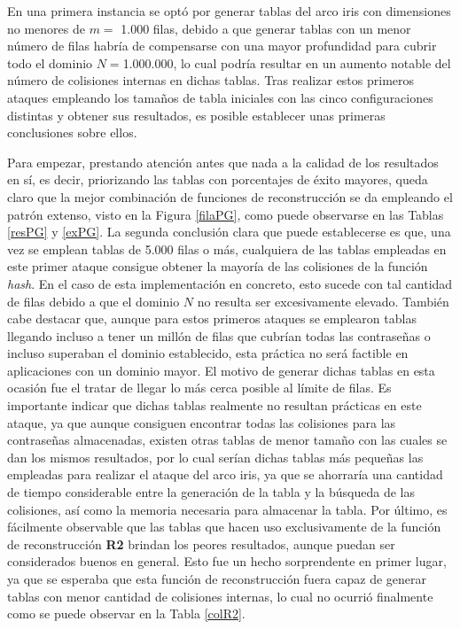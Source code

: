 \documentclass[12pt,spanish,listoffigures,listoftables,listofalgorithms]{tfgetsinf}
\newcommand{\hash}{\textit{hash}}
\begin{document}

En una primera instancia se optó por generar tablas del arco iris con dimensiones no menores de $m =$ 1.000 filas, debido a que generar tablas con un menor número de filas habría de compensarse con una mayor profundidad para cubrir todo el dominio $N = $1.000.000, lo cual podría resultar en un aumento notable del número de colisiones internas en dichas tablas. Tras realizar estos primeros ataques empleando los tamaños de tabla iniciales con las cinco configuraciones distintas y obtener sus resultados, es posible establecer unas primeras conclusiones sobre ellos.

Para empezar, prestando atención antes que nada a la calidad de los resultados en sí, es decir, priorizando las tablas con porcentajes de éxito mayores, queda claro que la mejor combinación de funciones de reconstrucción se da empleando el patrón extenso, visto en la Figura \ref{filaPG}, como puede observarse en las Tablas \ref{resPG} y \ref{exPG}. La segunda conclusión clara que puede establecerse es que, una vez se emplean tablas de 5.000 filas o más, cualquiera de las tablas empleadas en este primer ataque consigue obtener la mayoría de las colisiones de la función \hash. En el caso de esta implementación en concreto, esto sucede con tal cantidad de filas debido a que el dominio $N$ no resulta ser excesivamente elevado. También cabe destacar que, aunque para estos primeros ataques se emplearon tablas llegando incluso a tener un millón de filas que cubrían todas las contraseñas o incluso superaban el dominio establecido, esta práctica no será factible en aplicaciones con un dominio mayor. El motivo de generar dichas tablas en esta ocasión fue el tratar de llegar lo más cerca posible al límite de filas. Es importante indicar que dichas tablas realmente no resultan prácticas en este ataque, ya que aunque consiguen encontrar todas las colisiones para las contraseñas almacenadas, existen otras tablas de menor tamaño con las cuales se dan los mismos resultados, por lo cual serían dichas tablas más pequeñas las empleadas para realizar el ataque del arco iris, ya que se ahorraría una cantidad de tiempo considerable entre la generación de la tabla y la búsqueda de las colisiones, así como la memoria necesaria para almacenar la tabla. Por último, es fácilmente observable que las tablas que hacen uso exclusivamente de la función de reconstrucción \textbf{R2} brindan los peores resultados, aunque puedan ser considerados buenos en general. Esto fue un hecho sorprendente en primer lugar, ya que se esperaba que esta función de reconstrucción fuera capaz de generar tablas con menor cantidad de colisiones internas, lo cual no ocurrió finalmente como se puede observar en la Tabla \ref{colR2}.
\end{document}
